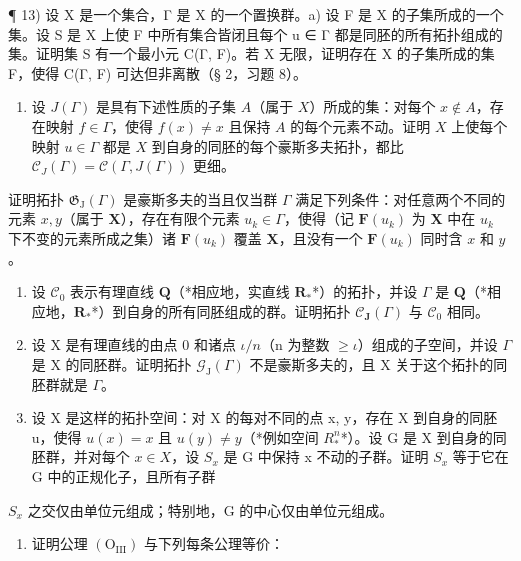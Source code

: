 ¶ 13) 设 X 是一个集合，Γ 是 X 的一个置换群。a) 设 F 是 X 的子集所成的一个集。设 S 是 X 上使 F 中所有集合皆闭且每个 u ∈ Γ 都是同胚的所有拓扑组成的集。证明集 S 有一个最小元 C(Γ, F)。若 X 无限，证明存在 X 的子集所成的集 F，使得 C(Γ, F) 可达但非离散（§ 2，习题 8）。

\begin{enumerate}
\def\labelenumi{\alph{enumi})}
\setcounter{enumi}{1}
\tightlist
\item
  设 \(J(\Gamma)\) 是具有下述性质的子集 \(A\)（属于 \(X\)）所成的集：对每个 \(x \notin A\)，存在映射 \(f \in \Gamma\)，使得 \(f(x) \neq x\) 且保持 \(A\) 的每个元素不动。证明 \(X\) 上使每个映射 \(u \in \Gamma\) 都是 \(X\) 到自身的同胚的每个豪斯多夫拓扑，都比 \(\mathcal{C}_{J}(\Gamma) = \mathcal{C}(\Gamma, J(\Gamma))\) 更细。
\end{enumerate}

证明拓扑 \(\mathfrak{G}_{\mathrm{J}}(\Gamma)\) 是豪斯多夫的当且仅当群 \(\Gamma\) 满足下列条件：对任意两个不同的元素 \(x, y\)（属于 \(\mathbf{X}\)），存在有限个元素 \(u_{k} \in \Gamma\)，使得（记 \(\mathbf{F}(u_{k})\) 为 \(\mathbf{X}\) 中在 \(u_{k}\) 下不变的元素所成之集）诸 \(\mathbf{F}(u_{k})\) 覆盖 \(\mathbf{X}\)，且没有一个 \(\mathbf{F}(u_{k})\) 同时含 \(x\) 和 \(y\)。

\begin{enumerate}
\def\labelenumi{\alph{enumi})}
\setcounter{enumi}{2}
\item
  设 \(\mathcal{C}_{0}\) 表示有理直线 \(\mathbf{Q}\)（*相应地，实直线 \(\mathbf{R}_{*}\)*）的拓扑，并设 \(\Gamma\) 是 \(\mathbf{Q}\)（*相应地，\(\mathbf{R}_{*}\)*）到自身的所有同胚组成的群。证明拓扑 \(\mathcal{C}_{\mathbf{J}}(\Gamma)\) 与 \(\mathcal{C}_{0}\) 相同。
\item
  设 X 是有理直线的由点 0 和诸点 \(\iota/n\)（n 为整数 \(\geqslant\iota\)）组成的子空间，并设 \(\Gamma\) 是 X 的同胚群。证明拓扑 \(\mathcal{G}_{\mathrm{J}}(\Gamma)\) 不是豪斯多夫的，且 X 关于这个拓扑的同胚群就是 \(\Gamma\)。
\item
  设 X 是这样的拓扑空间：对 X 的每对不同的点 x, y，存在 X 到自身的同胚 u，使得 \(u(x) = x\) 且 \(u(y) \neq y\)（*例如空间 \(R^{n}_{*}\)*）。设 G 是 X 到自身的同胚群，并对每个 \(x \in X\)，设 \(S_{x}\) 是 G 中保持 x 不动的子群。证明 \(S_{x}\) 等于它在 G 中的正规化子，且所有子群
\end{enumerate}

\(S_{x}\) 之交仅由单位元组成；特别地，G 的中心仅由单位元组成。

\begin{enumerate}
\def\labelenumi{\arabic{enumi})}
\setcounter{enumi}{13}
\tightlist
\item
  证明公理 \((\mathrm{O}_{\mathrm{III}})\) 与下列每条公理等价：
\end{enumerate}

